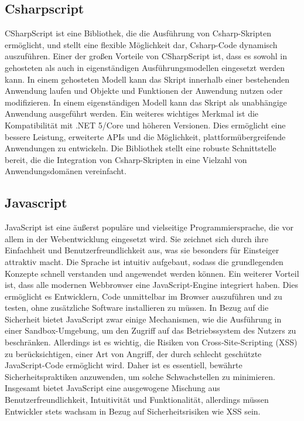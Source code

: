 \newpage
\subsection{Csharpscript}
CSharpScript ist eine Bibliothek, die die Ausführung von Csharp-Skripten ermöglicht, und stellt eine flexible Möglichkeit dar, Csharp-Code dynamisch auszuführen. 
Einer der großen Vorteile von CSharpScript ist, dass es sowohl in gehosteten als auch in eigenständigen Ausführungsmodellen eingesetzt werden kann. 
In einem gehosteten Modell kann das Skript innerhalb einer bestehenden Anwendung laufen und Objekte und Funktionen der Anwendung nutzen oder modifizieren. 
In einem eigenständigen Modell kann das Skript als unabhängige Anwendung ausgeführt werden. 
Ein weiteres wichtiges Merkmal ist die Kompatibilität mit .NET 5/Core und höheren Versionen. 
Dies ermöglicht eine bessere Leistung, erweiterte APIs und die Möglichkeit, plattformübergreifende Anwendungen zu entwickeln. 
Die Bibliothek stellt eine robuste Schnittstelle bereit, die die Integration von Csharp-Skripten in eine Vielzahl von Anwendungsdomänen vereinfacht.


\newpage
\subsection{Javascript}
JavaScript ist eine äußerst populäre und vielseitige Programmiersprache, die vor allem in der Webentwicklung eingesetzt wird. 
Sie zeichnet sich durch ihre Einfachheit und Benutzerfreundlichkeit aus, was sie besonders für Einsteiger attraktiv macht. 
Die Sprache ist intuitiv aufgebaut, sodass die grundlegenden Konzepte schnell verstanden und angewendet werden können. 
Ein weiterer Vorteil ist, dass alle modernen Webbrowser eine JavaScript-Engine integriert haben. 
Dies ermöglicht es Entwicklern, Code unmittelbar im Browser auszuführen und zu testen, ohne zusätzliche Software installieren zu müssen. 
In Bezug auf die Sicherheit bietet JavaScript zwar einige Mechanismen, wie die Ausführung in einer Sandbox-Umgebung, um den Zugriff auf das Betriebssystem des Nutzers zu beschränken. 
Allerdings ist es wichtig, die Risiken von Cross-Site-Scripting (XSS) zu berücksichtigen, einer Art von Angriff, der durch schlecht geschützte JavaScript-Code ermöglicht wird. 
Daher ist es essentiell, bewährte Sicherheitspraktiken anzuwenden, um solche Schwachstellen zu minimieren. 
Insgesamt bietet JavaScript eine ausgewogene Mischung aus Benutzerfreundlichkeit, Intuitivität und Funktionalität, allerdings müssen Entwickler stets wachsam in Bezug auf Sicherheitsrisiken wie XSS sein.

